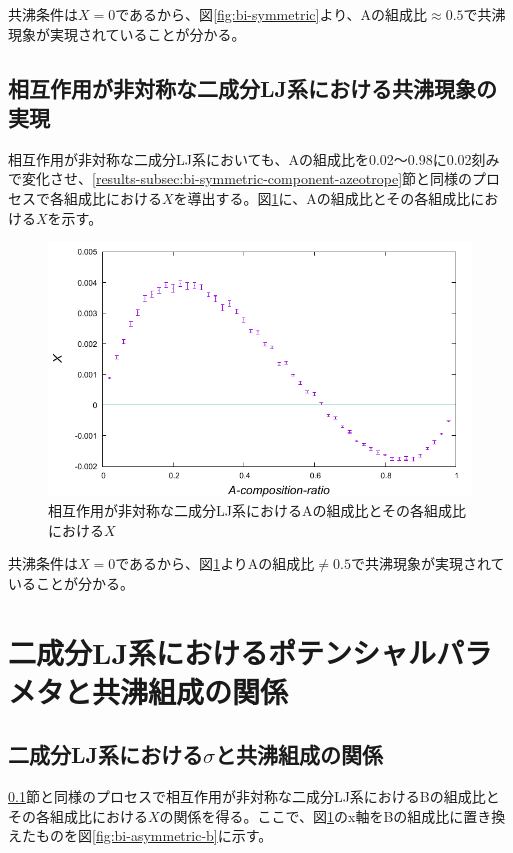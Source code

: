 \documentclass[titlepage]{jsreport}
\begin{document}
共沸条件は$X=0$であるから、図\ref{fig:bi-symmetric}より、Aの組成比$\approx0.5$で共沸現象が実現されていることが分かる。


\subsection{相互作用が非対称な二成分LJ系における共沸現象の実現} \label{results-subsec:bi-asymmetric-component-azeotrope}
相互作用が非対称な二成分LJ系においても、Aの組成比を0.02〜0.98に0.02刻みで変化させ、\ref{results-subsec:bi-symmetric-component-azeotrope}節と同様のプロセスで各組成比における$X$を導出する。図\ref{fig:bi-asymmetric}に、Aの組成比とその各組成比における$X$を示す。

\begin{figure}[htbp]
    \begin{center}
        \includegraphics[width=14cm]{fig/bi-asymmetric/L100T1.0E1.05.pdf}
    \end{center}
    \caption{相互作用が非対称な二成分LJ系におけるAの組成比とその各組成比における$X$}
    \label{fig:bi-asymmetric}
\end{figure}

共沸条件は$X=0$であるから、図\ref{fig:bi-asymmetric}よりAの組成比$\neq0.5$で共沸現象が実現されていることが分かる。

\newpage
\section{二成分LJ系におけるポテンシャルパラメタと共沸組成の関係} \label{results-sec:bi-component-potential-parameter-azeotrope-ratio}
\subsection{二成分LJ系における$\sigma$と共沸組成の関係} \label{results-subsec:bi-component-sigma-azeotrope-ratio}
\ref{results-subsec:bi-asymmetric-component-azeotrope}節と同様のプロセスで相互作用が非対称な二成分LJ系におけるBの組成比とその各組成比における$X$の関係を得る。ここで、図\ref{fig:bi-asymmetric}のx軸をBの組成比に置き換えたものを図\ref{fig:bi-asymmetric-b}に示す。
\end{document}

